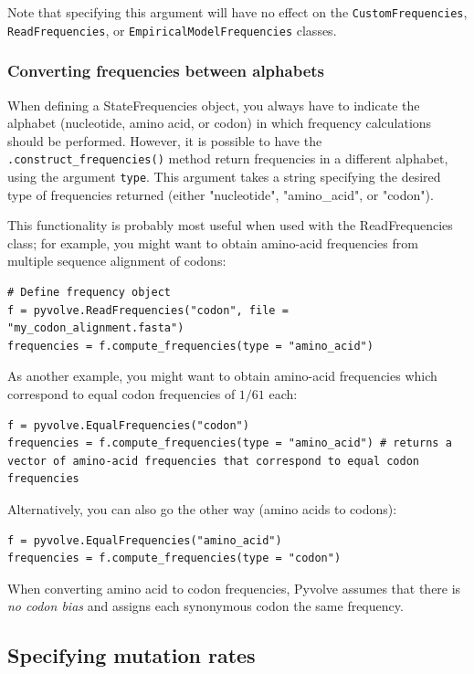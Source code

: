 \documentclass{article}
\newcommand{\code}[1]{\texttt{\small{#1}}}
\begin{document}
Note that specifying this argument will have no effect on the \code{CustomFrequencies}, \code{ReadFrequencies}, or \code{EmpiricalModelFrequencies} classes.






\subsubsection{Converting frequencies between alphabets}

When defining a StateFrequencies object, you always have to indicate the alphabet (nucleotide, amino acid, or codon) in which frequency calculations should be performed. However, it is possible to have the \code{.construct\_frequencies()} method return frequencies in a different alphabet, using the argument \code{type}. This argument takes a string specifying the desired type of frequencies returned (either "nucleotide", "amino\_acid", or "codon").

This functionality is probably most useful when used with the ReadFrequencies class; for example, you might want to obtain amino-acid frequencies from multiple sequence alignment of codons:
\begin{lstlisting}
# Define frequency object
f = pyvolve.ReadFrequencies("codon", file = "my_codon_alignment.fasta")
frequencies = f.compute_frequencies(type = "amino_acid")
\end{lstlisting}

As another example, you might want to obtain amino-acid frequencies which correspond to equal codon frequencies of $1/61$ each:
\begin{lstlisting}
f = pyvolve.EqualFrequencies("codon")
frequencies = f.compute_frequencies(type = "amino_acid") # returns a vector of amino-acid frequencies that correspond to equal codon frequencies
\end{lstlisting}

Alternatively, you can also go the other way (amino acids to codons):
\begin{lstlisting}
f = pyvolve.EqualFrequencies("amino_acid")
frequencies = f.compute_frequencies(type = "codon")
\end{lstlisting}
When converting amino acid to codon frequencies, Pyvolve assumes that there is \emph{no codon bias} and assigns each synonymous codon the same frequency. 



\subsection{Specifying mutation rates}\label{sec:mu}
\end{document}
